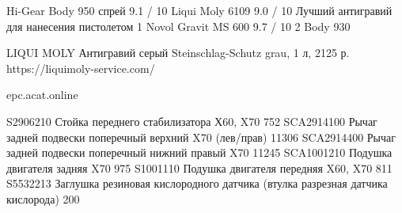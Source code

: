  Hi-Gear	
 Body 950 спрей	9.1 / 10
 Liqui Moly 6109	9.0 / 10
Лучший антигравий для нанесения пистолетом	1	Novol Gravit MS 600	9.7 / 10
2	Body 930


LIQUI MOLY Антигравий серый Steinschlag-Schutz grau, 1 л, 2125 р. 
https://liquimoly-service.com/

epc.acat.online

S2906210	Стойка переднего стабилизатора Х60, X70                   752 
SCA2914100	Рычаг задней подвески поперечный верхний X70 (лев/прав)   11306
SCA2914400	Рычаг задней подвески поперечный нижний правый X70        11245
SCA1001210	Подушка двигателя задняя X70                              975
S1001110	Подушка двигателя передняя X60, X70                       811
S5532213    Заглушка резиновая кислородного датчика (втулка разрезная датчика кислорода) 200